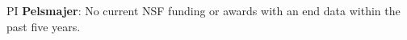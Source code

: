 \documentclass[11pt]{article}
\begin{document}
\noindent PI \textbf{Pelsmajer}: No current NSF funding or   awards with an end data within the past five years. 




\newpage
{}
\renewcommand{\thepage} {\arabic{page}}


% 
%

\end{document}
